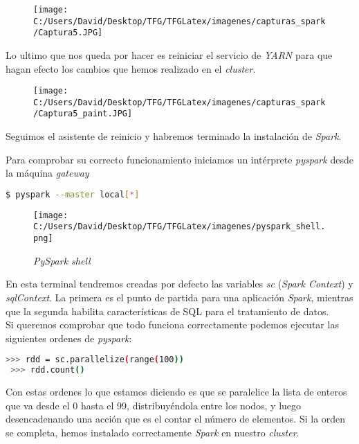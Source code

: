 \begin{figure}[!htpb]
  \centering
  \texttt{[image: C:/Users/David/Desktop/TFG/TFGLatex/imagenes/capturas\_spark/Captura5.JPG]}
\end{figure}

Lo ultimo que nos queda por hacer es reiniciar el servicio de \textit{YARN} para que hagan efecto
los cambios que hemos realizado en el \textit{cluster}.

\begin{figure}[!htpb]
  \centering
  \texttt{[image: C:/Users/David/Desktop/TFG/TFGLatex/imagenes/capturas\_spark/Captura5\_paint.JPG]}
\end{figure}

Seguimos el asistente de reinicio y habremos terminado la instalación de \textit{Spark}.
\newline

Para comprobar su correcto funcionamiento iniciamos un intérprete \textit{pyspark} desde la máquina \textit{gateway}
\begin{lstlisting}[language=bash, numbers=none]
$ pyspark --master local[*]
\end{lstlisting}

\clearpage

\begin{figure}[!htpb]
  \centering
  \texttt{[image: C:/Users/David/Desktop/TFG/TFGLatex/imagenes/pyspark\_shell.png]}
  \caption[\textit{PySpark shell}]{\textit{PySpark shell}}
  \label{pyspark_shell}
\end{figure}

En esta terminal tendremos creadas por defecto las variables \textit{sc} (\textit{Spark Context})
y \textit{sqlContext}. La primera es el punto de partida para una aplicación \textit{Spark}, mientras
que la segunda habilita características de SQL para el tratamiento de datos.\\
Si queremos comprobar que todo funciona correctamente podemos ejecutar las siguientes ordenes de \textit{pyspark}:

\begin{lstlisting}[language=bash, numbers=none]
 >>> rdd = sc.parallelize(range(100))
 >>> rdd.count()
\end{lstlisting}

Con estas ordenes lo que estamos diciendo es que se paralelice la lista de enteros que va desde el 0 hasta el 99,
distribuyéndola entre los nodos, y luego desencadenando una acción que es el contar el número de elementos.
Si la orden se completa, hemos instalado correctamente \textit{Spark} en nuestro \textit{cluster}.

